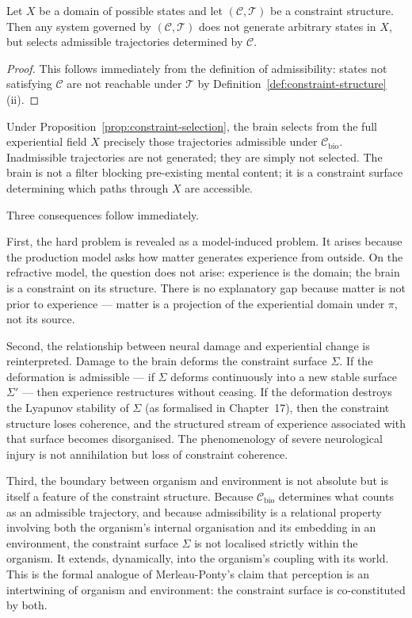 \documentclass[11pt,openany]{book}
\begin{document}
\begin{proposition}
\label{prop:constraint-selection}
Let $X$ be a domain of possible states and let
$(\mathcal{C}, \mathcal{T})$ be a constraint structure.
Then any system governed by $(\mathcal{C}, \mathcal{T})$
does not generate arbitrary states in $X$, but selects
admissible trajectories determined by $\mathcal{C}$.
\end{proposition}

\begin{proof}
This follows immediately from the definition of
admissibility: states not satisfying $\mathcal{C}$ are not
reachable under $\mathcal{T}$ by
Definition~\ref{def:constraint-structure}(ii).
\end{proof}

Under Proposition~\ref{prop:constraint-selection}, the brain
selects from the full experiential field $X$ precisely those
trajectories admissible under $\mathcal{C}_{\mathrm{bio}}$.
Inadmissible trajectories are not generated; they are simply
not selected.  The brain is not a filter blocking
pre-existing mental content; it is a constraint surface
determining which paths through $X$ are accessible.

Three consequences follow immediately.

First, the hard problem is revealed as a model-induced
problem.  It arises because the production model asks how
matter generates experience from outside.  On the refractive
model, the question does not arise: experience is the
domain; the brain is a constraint on its structure.  There
is no explanatory gap because matter is not prior to
experience --- matter is a projection of the experiential
domain under $\pi$, not its source.

Second, the relationship between neural damage and
experiential change is reinterpreted.  Damage to the brain
deforms the constraint surface $\Sigma$.  If the
deformation is admissible --- if $\Sigma$ deforms
continuously into a new stable surface $\Sigma'$ ---
then experience restructures without ceasing.  If the
deformation destroys the Lyapunov stability of $\Sigma$
(as formalised in Chapter~17), then the constraint structure
loses coherence, and the structured stream of experience
associated with that surface becomes disorganised.  The
phenomenology of severe neurological injury is not
annihilation but loss of constraint coherence.

Third, the boundary between organism and environment is not
absolute but is itself a feature of the constraint
structure.  Because $\mathcal{C}_{\mathrm{bio}}$ determines
what counts as an admissible trajectory, and because
admissibility is a relational property involving both the
organism's internal organisation and its embedding in an
environment, the constraint surface $\Sigma$ is not
localised strictly within the organism.  It extends,
dynamically, into the organism's coupling with its world.
This is the formal analogue of Merleau-Ponty's claim that
perception is an intertwining of organism and environment:
the constraint surface is co-constituted by both.
\end{document}
